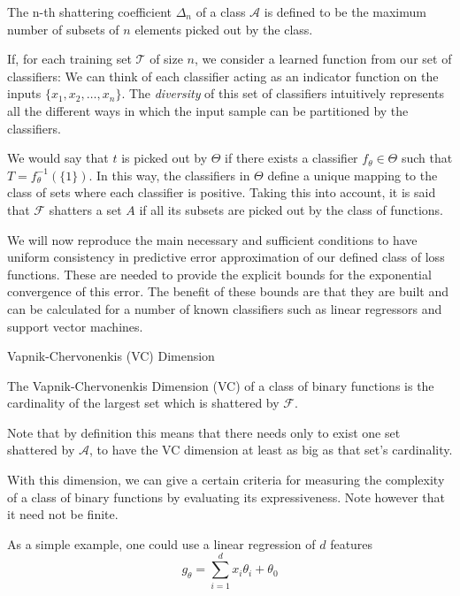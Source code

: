 The n-th shattering coefficient $\Delta_n$ of a class $\mathcal {A}$ is defined to be the maximum number of subsets of $n$ elements picked out by the class.

If, for each training set $\mathcal {T}$ of size $n$, we consider a learned function from our set of classifiers:
We can think of each classifier acting as an indicator function on the inputs $\{ x_1,x_2,\ldots,x_n \}$.
The \textit{diversity} of this set of classifiers intuitively represents all the different ways in which the input sample can be partitioned by the classifiers.

We would say that $t$ is picked out by $\Theta$ if there exists a classifier $f_{\theta} \in \Theta$ such that $T = f_{\theta}^{-1}(\{1\})$.
In this way, the classifiers in $\Theta$ define a unique mapping to the class of sets where each classifier is positive.
Taking this into account, it is said that $\mathcal {F}$ shatters a set $A$ if all its subsets are picked out by the class of functions.

We will now reproduce the main necessary and sufficient conditions to have uniform consistency in predictive error approximation of our defined class of loss functions.
These are needed to provide the explicit bounds for the exponential convergence of this error.
The benefit of these bounds are that they are built and can be calculated for a number of known classifiers such as linear regressors and support vector machines.


\begin{definition}{Vapnik-Chervonenkis (VC) Dimension}

The Vapnik-Chervonenkis Dimension (VC) of a class of binary functions is the cardinality of the largest set which is shattered by $\mathcal {F}$.
\end{definition}

Note that by definition this means that there needs only to exist one set shattered by $\mathcal {A}$, to have the VC dimension at least as big as that set's cardinality.

With this dimension, we can give a certain criteria for measuring the complexity of a class of binary functions by evaluating its expressiveness.
Note however that it need not be finite.

As a simple example, one could use a linear regression of $d$ features
\begin{equation}
g_{\theta} = \sum_{i=1}^d x_i \theta_i + \theta_0
\end{equation}

